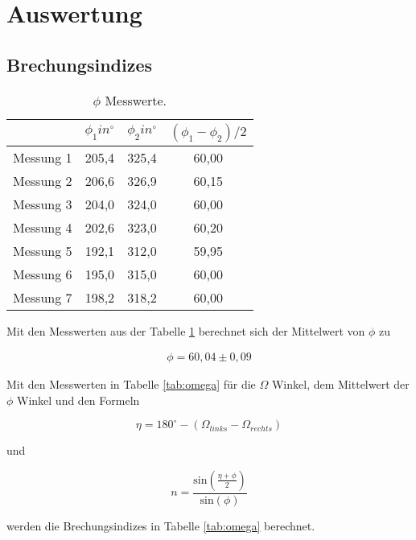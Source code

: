 \section{Auswertung}
\subsection{Brechungsindizes}
\label{sec:brech}

\label{sec:Auswertung}
\begin{table}
  \centering
  \caption{$\phi$ Messwerte.}
  \label{tab:phi}
\begin{tabular}{c c c c}
  \toprule
  & $\phi_1 in ^\circ$ & $\phi_2 in ^\circ$ & $(\phi_1 - \phi_2)/2$ \\
  \midrule
  Messung 1  &  205,4  &  325,4  &  60,00 \\
  Messung 2  &  206,6  &  326,9  &  60,15 \\
  Messung 3  &  204,0  &  324,0  &  60,00 \\
  Messung 4  &  202,6  &  323,0  &  60,20 \\
  Messung 5  &  192,1  &  312,0  &  59,95 \\
  Messung 6  &  195,0  &  315,0  &  60,00 \\
  Messung 7  &  198,2  &  318,2  &  60,00 \\
  \bottomrule
\end{tabular}
\end{table}
\FloatBarrier

Mit den Messwerten aus der Tabelle \ref{tab:phi} berechnet sich der Mittelwert von $\phi$ zu

\begin{align*}
  \phi = 60,04 \pm 0,09
\end{align*}


Mit den Messwerten in Tabelle \ref{tab:omega} für die $\Omega$ Winkel, dem Mittelwert der $\phi$ Winkel und den Formeln

\begin{equation}
  \eta = 180^\circ - (\Omega_{links} - \Omega_{rechts})
  \label{eqn:glausw1}
\end{equation}

und

\begin{equation}
  n = \frac{\text{sin}\left(\frac{\eta + \phi}{2}\right)}{\text{sin} \left(\phi\right)}
  \label{eqn:glausw1}
\end{equation}

werden die Brechungsindizes in Tabelle \ref{tab:omega} berechnet.

